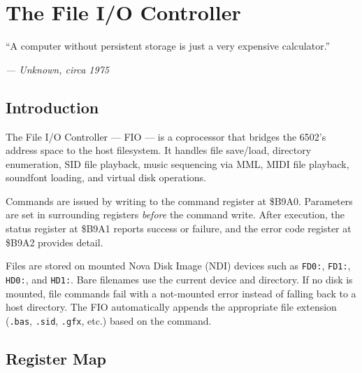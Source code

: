 \chapter{The File I/O Controller}

\epigraph{``A computer without persistent storage is just a very expensive
calculator.''}{\textit{--- Unknown, circa 1975}}

\section*{Introduction}

The File I/O Controller --- FIO --- is a coprocessor that bridges the 6502's
address space to the host filesystem.  It handles file save/load, directory
enumeration, SID file playback, music sequencing via MML, MIDI file playback,
soundfont loading, and virtual disk operations.

Commands are issued by writing to the command register at \$B9A0.  Parameters
are set in surrounding registers \emph{before} the command write.  After
execution, the status register at \$B9A1 reports success or failure, and the
error code register at \$B9A2 provides detail.

Files are stored on mounted Nova Disk Image (NDI) devices such as
\texttt{FD0:}, \texttt{FD1:}, \texttt{HD0:}, and \texttt{HD1:}.  Bare filenames
use the current device and directory.  If no disk is mounted, file commands fail
with a not-mounted error instead of falling back to a host directory.  The FIO
automatically appends the appropriate file extension (\texttt{.bas},
\texttt{.sid}, \texttt{.gfx}, etc.) based on the command.


\section{Register Map}
\label{sec:fio-registers}


